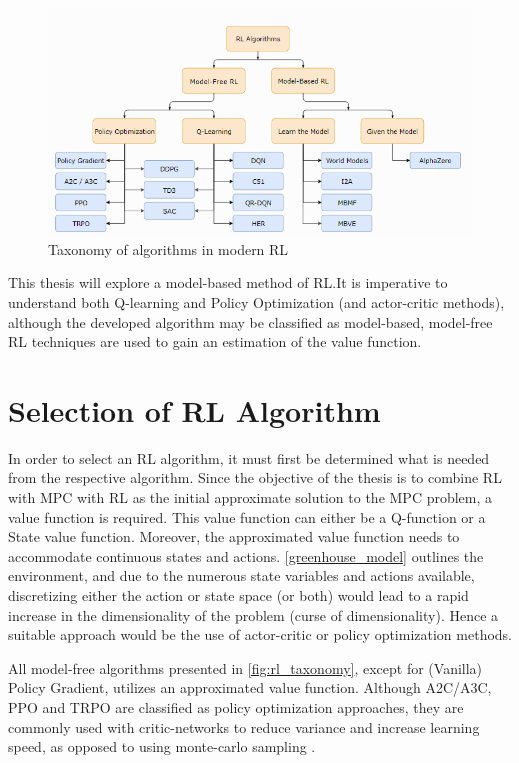 \begin{figure}[h]
	\centering
	\includegraphics{figures/rl_taxonomy.png}
	\caption{Taxonomy of algorithms in modern RL}
	\label{fig:rl_taxonomy}
\end{figure}

This thesis will explore a model-based method of RL.It is imperative to understand both Q-learning and Policy Optimization (and actor-critic methods),  although the developed algorithm may be classified as model-based, model-free RL techniques are used to gain an estimation of the value function. 


\section{Selection of RL Algorithm} \label{section:selection of RL algorithm}
In order to select an RL algorithm, it must first be determined what is needed from the respective algorithm. Since the objective of the thesis is to combine RL with MPC with RL as the initial approximate solution to the MPC problem, a value function is required. This value function can either be a Q-function or a State value function. Moreover, the approximated value function needs to accommodate continuous states and actions. \autoref{greenhouse_model} outlines the environment, and due to the numerous state variables and actions available, discretizing either the action or state space (or both) would lead to a rapid increase in the dimensionality of the problem (curse of dimensionality). Hence a suitable approach would be the use of actor-critic or policy optimization methods. 


All model-free algorithms presented in \autoref{fig:rl_taxonomy}, except for (Vanilla) Policy Gradient, utilizes an approximated value function. Although A2C/A3C, PPO and TRPO are classified as policy optimization approaches, they are commonly used with critic-networks to reduce variance and increase learning speed, as opposed to using monte-carlo sampling \cite{suttonReinforcementLearningIntroduction2014}.

